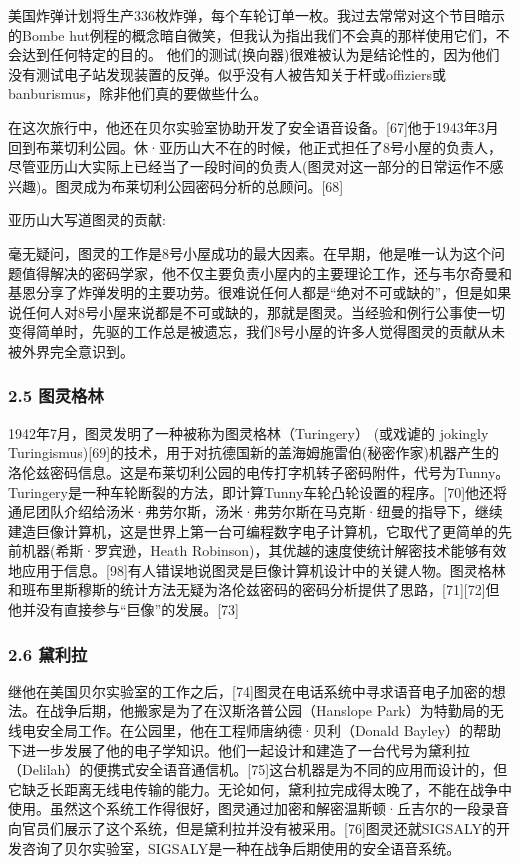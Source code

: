 美国炸弹计划将生产336枚炸弹，每个车轮订单一枚。我过去常常对这个节目暗示的Bombe hut例程的概念暗自微笑，但我认为指出我们不会真的那样使用它们，不会达到任何特定的目的。 他们的测试(换向器)很难被认为是结论性的，因为他们没有测试电子站发现装置的反弹。似乎没有人被告知关于杆或offiziers或banburismus，除非他们真的要做些什么。

在这次旅行中，他还在贝尔实验室协助开发了安全语音设备。[67]他于1943年3月回到布莱切利公园。休·亚历山大不在的时候，他正式担任了8号小屋的负责人，尽管亚历山大实际上已经当了一段时间的负责人(图灵对这一部分的日常运作不感兴趣)。图灵成为布莱切利公园密码分析的总顾问。[68]

亚历山大写道图灵的贡献:

毫无疑问，图灵的工作是8号小屋成功的最大因素。在早期，他是唯一认为这个问题值得解决的密码学家，他不仅主要负责小屋内的主要理论工作，还与韦尔奇曼和基恩分享了炸弹发明的主要功劳。很难说任何人都是“绝对不可或缺的”，但是如果说任何人对8号小屋来说都是不可或缺的，那就是图灵。当经验和例行公事使一切变得简单时，先驱的工作总是被遗忘，我们8号小屋的许多人觉得图灵的贡献从未被外界完全意识到。
\subsubsection{2.5 图灵格林}
1942年7月，图灵发明了一种被称为图灵格林（Turingery） (或戏谑的 jokingly Turingismus)[69]的技术，用于对抗德国新的盖海姆施雷伯(秘密作家)机器产生的洛伦兹密码信息。这是布莱切利公园的电传打字机转子密码附件，代号为Tunny。Turingery是一种车轮断裂的方法，即计算Tunny车轮凸轮设置的程序。[70]他还将通尼团队介绍给汤米·弗劳尔斯，汤米·弗劳尔斯在马克斯·纽曼的指导下，继续建造巨像计算机，这是世界上第一台可编程数字电子计算机，它取代了更简单的先前机器(希斯·罗宾逊，Heath Robinson)，其优越的速度使统计解密技术能够有效地应用于信息。[98]有人错误地说图灵是巨像计算机设计中的关键人物。图灵格林和班布里斯穆斯的统计方法无疑为洛伦兹密码的密码分析提供了思路，[71][72]但他并没有直接参与“巨像”的发展。[73]
\subsubsection{2.6 黛利拉}
继他在美国贝尔实验室的工作之后，[74]图灵在电话系统中寻求语音电子加密的想法。在战争后期，他搬家是为了在汉斯洛普公园（Hanslope Park）为特勤局的无线电安全局工作。在公园里，他在工程师唐纳德·贝利（Donald Bayley）的帮助下进一步发展了他的电子学知识。他们一起设计和建造了一台代号为黛利拉（Delilah）的便携式安全语音通信机。[75]这台机器是为不同的应用而设计的，但它缺乏长距离无线电传输的能力。无论如何，黛利拉完成得太晚了，不能在战争中使用。虽然这个系统工作得很好，图灵通过加密和解密温斯顿·丘吉尔的一段录音向官员们展示了这个系统，但是黛利拉并没有被采用。[76]图灵还就SIGSALY的开发咨询了贝尔实验室，SIGSALY是一种在战争后期使用的安全语音系统。
